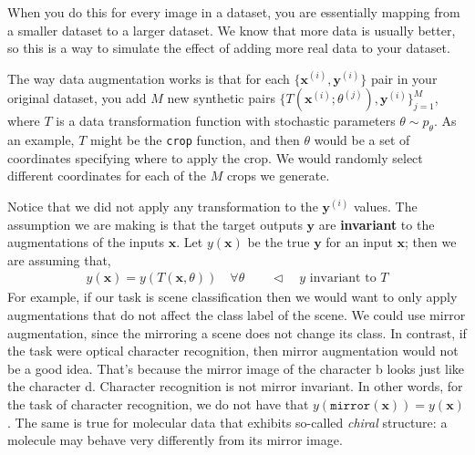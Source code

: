When you do this for every image in a dataset, you are essentially mapping from a smaller dataset to a larger dataset. We know that more data is usually better, so this is a way to simulate the effect of adding more real data to your dataset.
\begin{center}
\end{center}

The way data augmentation works is that for each $\{\mathbf{x}^{(i)}, \mathbf{y}^{(i)}\}$ pair in your original dataset, you add $M$ new synthetic pairs $\{T(\mathbf{x}^{(i)};\theta^{(j)}), \mathbf{y}^{(i)}\}_{j=1}^M$, where $T$ is a data transformation function with stochastic parameters $\theta \sim p_{\theta}$. As an example, $T$ might be the \texttt{crop} function, and then $\theta$ would be a set of coordinates specifying where to apply the crop. We would randomly select different coordinates for each of the $M$ crops we generate.

Notice that we did not apply any transformation to the $\mathbf{y}^{(i)}$ values. The assumption we are making is that the target outputs $\mathbf{y}$ are \textbf{invariant} to the augmentations of the inputs $\mathbf{x}$. Let $y(\mathbf{x})$ be the true $\mathbf{y}$ for an input $\mathbf{x}$; then we are assuming that,
\begin{align}
    y(\mathbf{x}) = y(T(\mathbf{x},\theta)) \quad \forall \theta \quad\quad \triangleleft \quad\text{$y$ invariant to $T$}
\end{align}
For example, if our task is scene classification then we would want to only apply augmentations that do not affect the class label of the scene. We could use mirror augmentation, since the mirroring a scene does not change its class. In contrast, if the task were optical character recognition, then mirror augmentation would not be a good idea. That's because the mirror image of the character \textsf{b} looks just like the character \textsf{d}. Character recognition is not mirror invariant. In other words, for the task of character recognition, we do not have that $y(\texttt{mirror}(\mathbf{x})) = y(\mathbf{x})$. The same is true for molecular data that exhibits so-called \textit{chiral} structure: a molecule may behave very differently from its mirror image.

